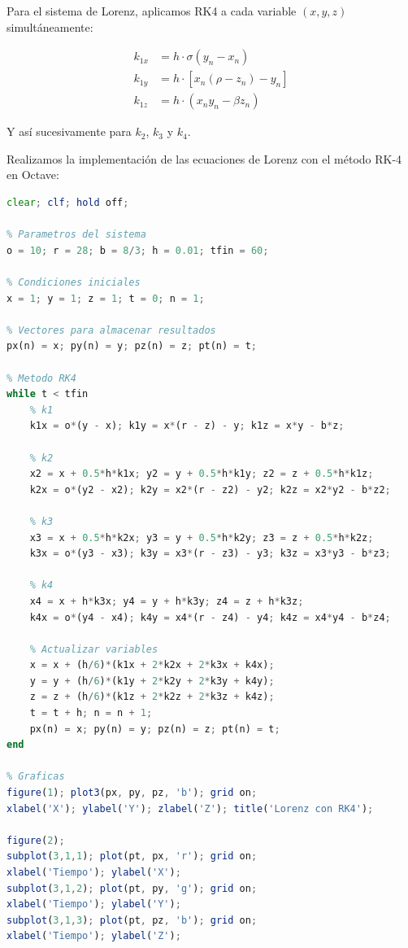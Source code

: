 \documentclass[a4paper,12pt]{article}
\theoremstyle{mytheor}
\begin{document}
Para el sistema de Lorenz, aplicamos RK4 a cada variable $(x, y, z)$ simultáneamente:

\begin{equation}
\begin{aligned}
k_{1x} &= h \cdot \sigma(y_n - x_n) \\
k_{1y} &= h \cdot [x_n(\rho - z_n) - y_n] \\
k_{1z} &= h \cdot (x_n y_n - \beta z_n)
\end{aligned}
\end{equation}

Y así sucesivamente para $k_2$, $k_3$ y $k_4$.

Realizamos la implementación de las ecuaciones de Lorenz con el método RK-4 en Octave:

\begin{lstlisting}[language=Octave, breaklines=true]
clear; clf; hold off;

% Parametros del sistema
o = 10; r = 28; b = 8/3; h = 0.01; tfin = 60;

% Condiciones iniciales
x = 1; y = 1; z = 1; t = 0; n = 1;

% Vectores para almacenar resultados
px(n) = x; py(n) = y; pz(n) = z; pt(n) = t;

% Metodo RK4
while t < tfin
    % k1
    k1x = o*(y - x); k1y = x*(r - z) - y; k1z = x*y - b*z;
    
    % k2
    x2 = x + 0.5*h*k1x; y2 = y + 0.5*h*k1y; z2 = z + 0.5*h*k1z;
    k2x = o*(y2 - x2); k2y = x2*(r - z2) - y2; k2z = x2*y2 - b*z2;
    
    % k3
    x3 = x + 0.5*h*k2x; y3 = y + 0.5*h*k2y; z3 = z + 0.5*h*k2z;
    k3x = o*(y3 - x3); k3y = x3*(r - z3) - y3; k3z = x3*y3 - b*z3;
    
    % k4
    x4 = x + h*k3x; y4 = y + h*k3y; z4 = z + h*k3z;
    k4x = o*(y4 - x4); k4y = x4*(r - z4) - y4; k4z = x4*y4 - b*z4;
    
    % Actualizar variables
    x = x + (h/6)*(k1x + 2*k2x + 2*k3x + k4x);
    y = y + (h/6)*(k1y + 2*k2y + 2*k3y + k4y);
    z = z + (h/6)*(k1z + 2*k2z + 2*k3z + k4z);
    t = t + h; n = n + 1;
    px(n) = x; py(n) = y; pz(n) = z; pt(n) = t;
end

% Graficas
figure(1); plot3(px, py, pz, 'b'); grid on;
xlabel('X'); ylabel('Y'); zlabel('Z'); title('Lorenz con RK4');

figure(2);
subplot(3,1,1); plot(pt, px, 'r'); grid on;
xlabel('Tiempo'); ylabel('X');
subplot(3,1,2); plot(pt, py, 'g'); grid on;
xlabel('Tiempo'); ylabel('Y');
subplot(3,1,3); plot(pt, pz, 'b'); grid on;
xlabel('Tiempo'); ylabel('Z');
\end{lstlisting}
\end{document}
